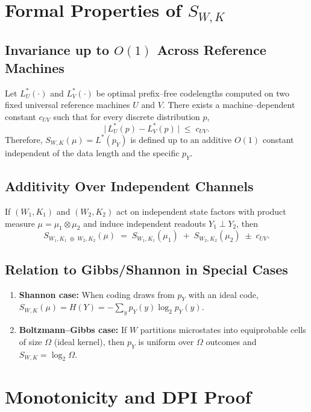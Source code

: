\documentclass[11pt,letterpaper]{article}
\theoremstyle{definition}
\theoremstyle{remark}
\begin{document}
\appendix

\section{Formal Properties of \texorpdfstring{\(S_{W,K}\)}{S\_WK}}\label{app:properties}

\subsection{Invariance up to \texorpdfstring{\(O(1)\)}{O(1)} Across Reference Machines}

Let \(L^\ast_U(\cdot)\) and \(L^\ast_V(\cdot)\) be optimal prefix--free codelengths computed on two fixed universal reference machines \(U\) and \(V\). There exists a machine--dependent constant \(c_{UV}\) such that for every discrete distribution \(p\),
\[
\big|\,L^\ast_U(p) - L^\ast_V(p)\,\big| \;\le\; c_{UV}.
\]
Therefore, \(S_{W,K}(\mu)=L^\ast(p_Y)\) is defined up to an additive \(O(1)\) constant independent of the data length and the specific \(p_Y\).

\subsection{Additivity Over Independent Channels}

If \((W_1,K_1)\) and \((W_2,K_2)\) act on independent state factors with product measure \(\mu=\mu_1\otimes\mu_2\) and induce independent readouts \(Y_1\perp Y_2\), then
\[
S_{W_1\!,K_1\;\oplus\;W_2\!,K_2}(\mu) \;=\; S_{W_1,K_1}(\mu_1) \;+\; S_{W_2,K_2}(\mu_2) \;\pm\; c_{UV}.
\]

\subsection{Relation to Gibbs/Shannon in Special Cases}

\begin{enumerate}[label=(\roman*)]
  \item \textbf{Shannon case:} When coding draws from \(p_Y\) with an ideal code, \(S_{W,K}(\mu)=H(Y)=-\sum_y p_Y(y)\log_2 p_Y(y)\).
  \item \textbf{Boltzmann--Gibbs case:} If \(W\) partitions microstates into equiprobable cells of size \(\Omega\) (ideal kernel), then \(p_Y\) is uniform over \(\Omega\) outcomes and \(S_{W,K}=\log_2\Omega\).
\end{enumerate}

\section{Monotonicity and DPI Proof}\label{app:monotonicity}
\end{document}
